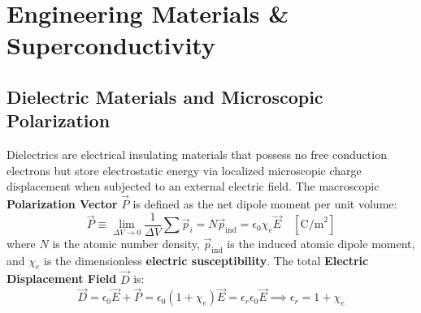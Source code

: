 \chapter{Engineering Materials \& Superconductivity}

\section{Dielectric Materials and Microscopic Polarization}
Dielectrics are electrical insulating materials that possess no free conduction electrons but store electrostatic energy via localized microscopic charge displacement when subjected to an external electric field.
The macroscopic \textbf{Polarization Vector} $\vec{P}$ is defined as the net dipole moment per unit volume:
\begin{equation}
\vec{P} \equiv \lim_{\Delta V \to 0}\frac{1}{\Delta V}\sum \vec{p}_i = N \vec{p}_{\text{ind}} = \epsilon_0 \chi_e \vec{E} \quad \left[\text{C/m}^2\right]
\end{equation}
where $N$ is the atomic number density, $\vec{p}_{\text{ind}}$ is the induced atomic dipole moment, and $\chi_e$ is the dimensionless \textbf{electric susceptibility}.
The total \textbf{Electric Displacement Field} $\vec{D}$ is:
\begin{equation}
\vec{D} = \epsilon_0 \vec{E} + \vec{P} = \epsilon_0 (1 + \chi_e)\vec{E} = \epsilon_r \epsilon_0 \vec{E} \implies \epsilon_r = 1 + \chi_e
\end{equation}

